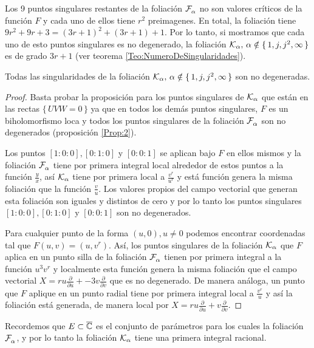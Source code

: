 Los 9 puntos singulares restantes de la foliación $\mathcal{F}^{\ }_{\alpha}$ no son valores críticos de la función $F$ y cada uno de ellos tiene $r^{2}$ preimagenes. En total, la foliación tiene $9r^{2}+9r+3=(3r+1)^{2}+(3r+1)+1$. Por lo tanto, si mostramos que cada uno de esto puntos singulares es no degenerado, la foliación $\mathcal{K}_{\alpha},\, \alpha\notin\{\, 1,j,j^{2},\infty\, \}$ es de grado $3r+1$ (ver teorema \ref{Teo:NumeroDeSingularidades}).

\begin{Proposicion}
\label{Prop:SingularidadesK}
Todas las singularidades de la foliación $\mathcal{K}_{\alpha},\, \alpha\notin\{\, 1,j,j^{2},\infty\, \}$ son no degeneradas.
\end{Proposicion}
\begin{proof}
Basta probar la proposición para los puntos singulares de $\mathcal{K}_{\alpha}$ que están en las rectas $\{\,  UVW=0\,\}$ ya que en todos los demás puntos singulares, $F$ es un biholomorfismo loca y todos los puntos singulares de la foliación $\mathcal{F}^{\ }_{\alpha}$ son no degenerados (proposición \ref{Prop:2}).

Los puntos $[1:0:0],[0:1:0]$ y $[0:0:1]$ se aplican bajo $F$ en ellos mismos y la foliación $\mathcal{F}^{\ }_{\alpha}$ tiene por primera integral local alrededor de estos puntos a la función $\tfrac{y}{x}$, así $\mathcal{K}_{\alpha}$ tiene por primera local a $\tfrac{v^{r}}{u^{r}}$ y está función genera la misma foliación que la función $\tfrac{v}{u}$. Los valores propios del campo vectorial que generan esta foliación son iguales y distintos de cero y por lo tanto los puntos singulares $[1:0:0],[0:1:0]$ y $[0:0:1]$ son no degenerados.

Para cualquier punto de la forma $(u,0), u\neq 0$ podemos encontrar coordenadas tal que $F(u,v)=(u,v^{r})$. Así, los puntos singulares de la foliación $\mathcal{K}_{\alpha}$ que $F$ aplica en un punto silla de la foliación $\mathcal{F}^{\ }_{\alpha}$ tienen por primera integral a la función $u^{3}v^{r}$ y localmente esta función genera la misma foliación que el campo vectorial $X=ru\tfrac{\partial}{\partial u}+-3v\tfrac{\partial}{\partial v}$ que es no degenerado. De manera análoga, un punto que $F$ aplique en un punto radial tiene por primera integral local a $\tfrac{v^{r}}{u}$ y así la foliación está generada, de manera local por $X=ru\tfrac{\partial}{\partial u}+ v\tfrac{\partial}{\partial v}$. 
\end{proof}

Recordemos que $E\subset\overline{\mathbb{C}}$ es el conjunto de parámetros para los cuales la foliación $\mathcal{F}^{\ }_{\alpha}$, y por lo tanto la foliación $\mathcal{K}_{\alpha}$ tiene una primera integral racional.

